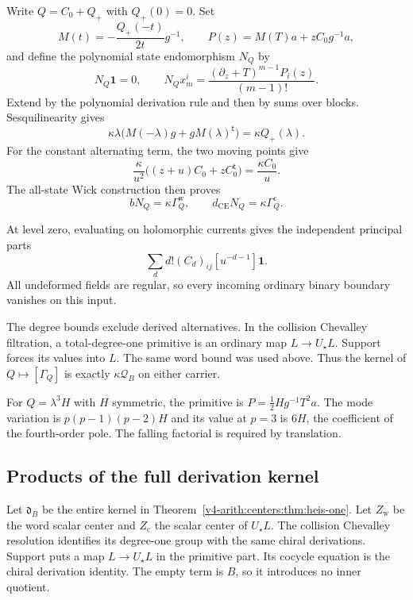 Write $Q=C_0+Q_+$ with
$Q_+(0)=0$. Set
\[
 M(t)=-\frac{Q_+(-t)}{2t}g^{-1},\qquad
 P(z)=M(T)a+zC_0g^{-1}a,
\]
and define the polynomial
state endomorphism $N_Q$ by
\[
 N_Q\mathbf1=0,\qquad
 N_Qx^i_m=
 \frac{(\partial_z+T)^{m-1}P_i(z)}{(m-1)!}.
\]
Extend by the polynomial
derivation rule and then
by sums over blocks.
Sesquilinearity gives
\[
 \kappa\lambda
 \bigl(M(-\lambda)g+gM(\lambda)^{\mathsf t}\bigr)
 =\kappa Q_+(\lambda).
\]
For the constant alternating
term, the two moving points
give
\[
 \frac{\kappa}{u^2}
 \bigl((z+u)C_0+zC_0^{\mathsf t}\bigr)
 =\frac{\kappa C_0}{u}.
\]
The all-state Wick construction
then proves
\begin{equation}\label{v4-arith:centers:eq:central-boundaries}
 bN_Q=\kappa\Gamma_Q^{\mathrm w},
 \qquad d_{\mathrm{CE}}N_Q=\kappa\Gamma_Q^{\mathrm c}.
\end{equation}

At level zero, evaluating
on holomorphic currents
gives the independent
principal parts
\[
 \sum_d d!(C_d)_{ij}[u^{-d-1}]\mathbf1.
\]
All undeformed fields are
regular, so every incoming
ordinary binary boundary
vanishes on this input.

The degree bounds exclude derived alternatives.
In the collision Chevalley filtration, a total-degree-one
primitive is an ordinary map $L\to U_\star L$.
Support forces its values into $L$. The same word
bound was used above.
Thus the kernel of
$Q\mapsto[\Gamma_Q]$ is
exactly $\kappa\mathcal Q_B$
on either carrier.

For $Q=\lambda^3H$ with
$H$ symmetric, the primitive
is $P=\tfrac12Hg^{-1}T^2a$.
The mode variation is
$p(p-1)(p-2)H$ and its
value at $p=3$ is $6H$,
the coefficient of the
fourth-order pole.
The falling factorial
is required by translation.

\subsection{Products of the full derivation kernel}
\label{v4-arith:centers:subsec:common-sector}

Let $\mathfrak d_B$ be the
entire kernel in
Theorem~\ref{v4-arith:centers:thm:heis-one}.
Let $Z_{\mathrm w}$ be
the word scalar center and
$Z_{\mathrm c}$ the scalar
center of $U_\star L$.
The collision Chevalley resolution identifies its degree-one
group with the same chiral derivations. Support puts a map
$L\to U_\star L$ in the primitive part. Its cocycle equation
is the chiral derivation identity.
The empty term is $B$,
so it introduces no inner
quotient.


